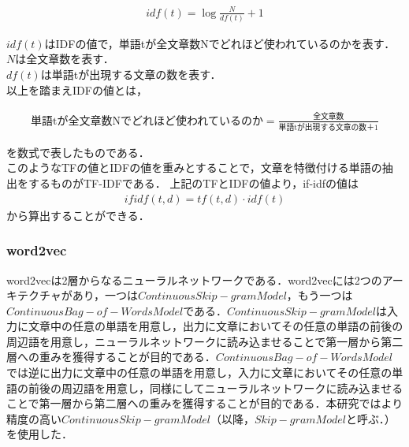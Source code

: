 \begin{align}
idf(t) = \log{\frac{N}{df(t)}+1} \nonumber
\end{align}

$ idf(t) $はIDFの値で，単語tが全文章数Nでどれほど使われているのかを表す．\\
$ N $は全文章数を表す．\\
$ df(t) $は単語tが出現する文章の数を表す．\\
以上を踏まえIDFの値とは，

\begin{align}
\mbox{単語tが全文章数Nでどれほど使われているのか} = \frac{\mbox{全文章数}}{\mbox{単語tが出現する文章の数}＋1} \nonumber
\end{align}

を数式で表したものである．\\
このようなTFの値とIDFの値を重みとすることで，文章を特徴付ける単語の抽出をするものがTF-IDFである．
上記のTFとIDFの値より，if-idfの値は
\begin{align}
ifidf(t,d) = tf(t,d) \cdot idf(t) \nonumber
\end{align}
から算出することができる．

\subsubsection{word2vec}
\label{tech:word2vec}
word2vecは2層からなるニューラルネットワークである．word2vecには2つのアーキテクチャがあり，一つは$ Continuous Skip-gram Model $，もう一つは$ Continuous Bag-of-Words Model $である．$ Continuous Skip-gram Model $は入力に文章中の任意の単語を用意し，出力に文章においてその任意の単語の前後の周辺語を用意し，ニューラルネットワークに読み込ませることで第一層から第二層への重みを獲得することが目的である．$ Continuous Bag-of-Words Model $では逆に出力に文章中の任意の単語を用意し，入力に文章においてその任意の単語の前後の周辺語を用意し，同様にしてニューラルネットワークに読み込ませることで第一層から第二層への重みを獲得することが目的である．本研究ではより精度の高い$ Continuous Skip-gram Model $（以降，$ Skip-gram Model $と呼ぶ．）を使用した．\cite{word2vecpaper}

